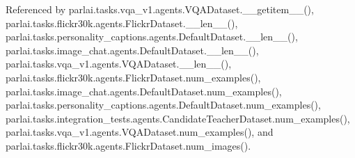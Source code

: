 Referenced by parlai.\+tasks.\+vqa\+\_\+v1.\+agents.\+V\+Q\+A\+Dataset.\+\_\+\+\_\+getitem\+\_\+\+\_\+(), parlai.\+tasks.\+flickr30k.\+agents.\+Flickr\+Dataset.\+\_\+\+\_\+len\+\_\+\+\_\+(), parlai.\+tasks.\+personality\+\_\+captions.\+agents.\+Default\+Dataset.\+\_\+\+\_\+len\+\_\+\+\_\+(), parlai.\+tasks.\+image\+\_\+chat.\+agents.\+Default\+Dataset.\+\_\+\+\_\+len\+\_\+\+\_\+(), parlai.\+tasks.\+vqa\+\_\+v1.\+agents.\+V\+Q\+A\+Dataset.\+\_\+\+\_\+len\+\_\+\+\_\+(), parlai.\+tasks.\+flickr30k.\+agents.\+Flickr\+Dataset.\+num\+\_\+examples(), parlai.\+tasks.\+image\+\_\+chat.\+agents.\+Default\+Dataset.\+num\+\_\+examples(), parlai.\+tasks.\+personality\+\_\+captions.\+agents.\+Default\+Dataset.\+num\+\_\+examples(), parlai.\+tasks.\+integration\+\_\+tests.\+agents.\+Candidate\+Teacher\+Dataset.\+num\+\_\+examples(), parlai.\+tasks.\+vqa\+\_\+v1.\+agents.\+V\+Q\+A\+Dataset.\+num\+\_\+examples(), and parlai.\+tasks.\+flickr30k.\+agents.\+Flickr\+Dataset.\+num\+\_\+images().

